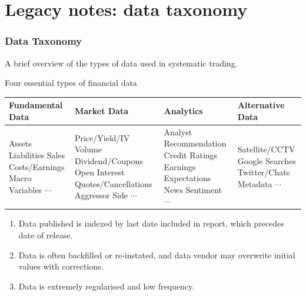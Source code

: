 \documentclass[a4paper,oneside,openany]{book}
\begin{document}
\chapter*{Legacy notes: data taxonomy}

\subsection*{Data Taxonomy}

A brief overview of the types of data used in systematic trading.

\begin{flushleft}
Four essential types of financial data
\begin{tabularx}{\textwidth}{X|X|p{13em}|X}
\hline
\rowcolor{gray!30}
Fundamental Data & Market Data & Analytics & Alternative Data \\
\hline
Assets \newline
Liabilities \newline
Sales \newline
Costs/Earnings \newline
Macro Variables \newline
$\cdots$
&
Price/Yield/IV \newline
Volume \newline
Dividend/Coupons \newline
Open Interest \newline
Quotes/Cancellations \newline
Aggressor Side \newline
$\cdots$
&
Analyst Recommendation \newline
Credit Ratings \newline
Earnings Expectations \newline
News Sentiment \newline
$\cdots$
&
Satellite/CCTV \newline
Google Searches \newline
Twitter/Chats \newline
Metadata \newline
$\cdots$ \\
\hline
\end{tabularx}
\end{flushleft}

\begin{remark} 
\begin{enumerate}[label=\roman*.]
\setlength{\itemsep}{0pt}
\item Data published is indexed by last date included in report, which precedes date of release.
\item Data is often backfilled or re-instated, and data vendor may overwrite initial values with corrections.
\item Data is extremely regularised and low frequency.
\end{enumerate}
\end{remark}
\end{document}
